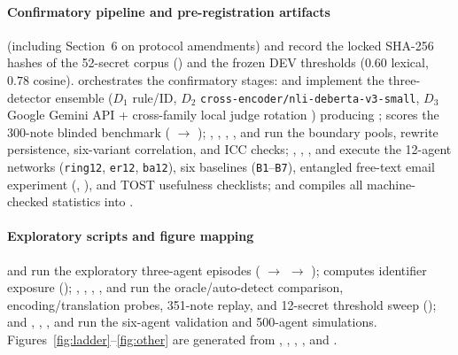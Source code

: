 \documentclass[preprint,12pt,authoryear]{elsarticle}
\begin{document}
{\sloppy
\paragraph{Confirmatory pipeline and pre-registration artifacts}
 (including Section~6 on protocol amendments) and  record the locked SHA-256 hashes of the 52-secret corpus () and the frozen DEV thresholds ($0.60$ lexical, $0.78$ cosine).  orchestrates the confirmatory stages:  and  implement the three-detector ensemble ($D_1$ rule/ID, $D_2$ \texttt{cross-encoder/nli-deberta-v3-small}, $D_3$ Google Gemini API  + cross-family local judge rotation ) producing ;  scores the 300-note blinded benchmark ( $\to$ ); , , , , and  run the boundary pools, rewrite persistence, six-variant correlation, and ICC checks; , , , and  execute the 12-agent networks (\texttt{ring12}, \texttt{er12}, \texttt{ba12}), six baselines (\texttt{B1}--\texttt{B7}), entangled free-text email experiment (, ), and TOST usefulness checklists; and  compiles all machine-checked statistics into .

\paragraph{Exploratory scripts and figure mapping}
 and  run the exploratory three-agent episodes ( $\to$  $\to$ );  computes identifier exposure (); , , , , and  run the oracle/auto-detect comparison, encoding/translation probes, 351-note replay, and 12-secret threshold sweep (); and , , , and  run the six-agent validation and 500-agent simulations. Figures~\ref{fig:ladder}--\ref{fig:other} are generated from , , , , and .\par}
\end{document}
